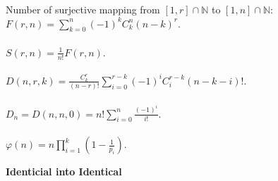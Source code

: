 \documentclass[11pt]{article}
\begin{document}
\begin{multicols*}{3}
        Number of surjective mapping from $[1, r] \cap \mathbb{N}$ to $[1, n] \cap \mathbb{N}$: $F(r, n) = \sum_{k = 0}^{n}(-1)^kC^n_k(n - k)^r$.
        \\\\
        $S(r, n) = \frac{1}{n!}F(r, n)$.
        \\\\
        $D(n, r, k) = \frac{C^r_k}{(n - r)!}\sum_{i = 0}^{r - k}(-1)^iC^{r - k}_i(n - k - i)!$.
        \\\\
        $D_n = D(n, n, 0) = n!\sum_{i = 0}^{n}\frac{(-1)^i}{i!}$.
        \\\\
        $\varphi(n) = n\prod_{i = 1}^{k}\left(1 - \frac{1}{p_i}\right)$.

        \textbf{Identicial into Identical}


\end{multicols*}
\end{document}
